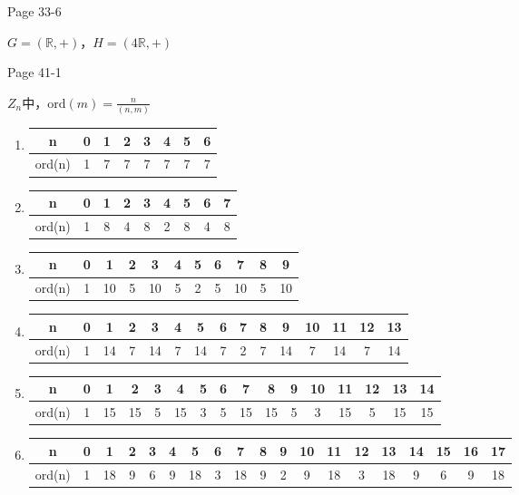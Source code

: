 \documentclass{ximera}
\begin{document}
\begin{problem} Page 33-6
    \begin{solution}
        $G = (\mathbb{R}, +)$，$H = (4\mathbb{R}, +)$
    \end{solution}
\end{problem}

\begin{problem} Page 41-1
    \begin{solution} $Z_n$中，$\text{ord}(m)=\frac n {(n,m)}$
        \begin{enumerate}[label=(\arabic*)]
            \item
            \begin{tabular}{|c|c|c|c|c|c|c|c|}
                \hline n&0&1&2&3&4&5&6\\
                \hline ord(n)&1&7&7&7&7&7&7\\
                \hline
            \end{tabular}
            \item
            \begin{tabular}{|c|c|c|c|c|c|c|c|c|}
                \hline n&0&1&2&3&4&5&6&7\\
                \hline ord(n)&1&8&4&8&2&8&4&8\\
                \hline
            \end{tabular}
            \item
            \begin{tabular}{|c|c|c|c|c|c|c|c|c|c|c|}
                \hline n&0&1&2&3&4&5&6&7&8&9\\
                \hline ord(n)&1&10&5&10&5&2&5&10&5&10\\
                \hline
            \end{tabular}
            \item
            \begin{tabular}{|c|c|c|c|c|c|c|c|c|c|c|c|c|c|c|}
                \hline n&0&1&2&3&4&5&6&7&8&9&10&11&12&13\\
                \hline ord(n)&1&14&7&14&7&14&7&2&7&14&7&14&7&14\\
                \hline
            \end{tabular}
            \item
            \begin{tabular}{|c|c|c|c|c|c|c|c|c|c|c|c|c|c|c|c|}
                \hline n&0&1&2&3&4&5&6&7&8&9&10&11&12&13&14\\
                \hline ord(n)&1&15&15&5&15&3&5&15&15&5&3&15&5&15&15\\
                \hline
            \end{tabular}
            \item
            \begin{tabular}{|c|c|c|c|c|c|c|c|c|c|c|c|c|c|c|c|c|c|c|}
                \hline n&0&1&2&3&4&5&6&7&8&9&10&11&12&13&14&15&16&17\\
                \hline ord(n)&1&18&9&6&9&18&3&18&9&2&9&18&3&18&9&6&9&18\\
                \hline
            \end{tabular}            
        \end{enumerate}
        

\end{solution}
\end{problem}
\end{document}
